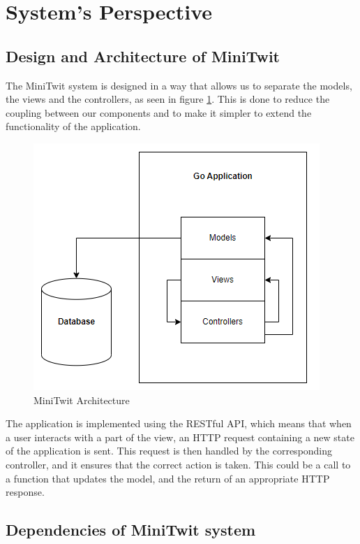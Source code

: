 \section{System's Perspective}

\subsection{Design and Architecture of MiniTwit}
The MiniTwit system is designed in a way that allows us to separate the models, the views and the controllers,
as seen in figure \ref{fig:minitwit}. This is done to reduce the coupling between our components and to make 
it simpler to extend the functionality of the application.  

\begin{figure}[H]
    \centering
    \captionsetup{justification=centering,margin=1cm}
    \includegraphics[width=0.8\linewidth]{report/images/system_architecture.png}
    \caption{MiniTwit Architecture}
    \label{fig:minitwit}
\end{figure}

The application is implemented using the RESTful API, which means that when a user interacts with a part of the 
view, an HTTP request containing a new state of the application is sent. This request is then handled by the corresponding controller, and it ensures 
that the correct action is taken. This could be a call to a function that updates the model, and the return of 
an appropriate HTTP response. 


\subsection{Dependencies of MiniTwit system}

